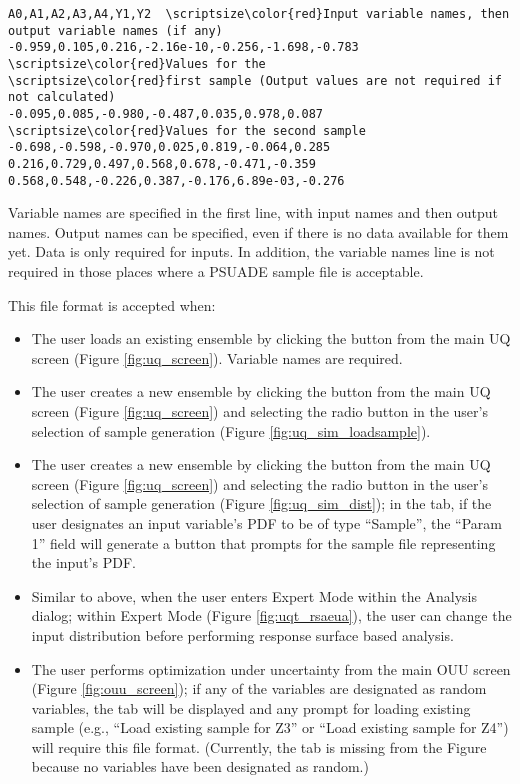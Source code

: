 \begin{Verbatim}[commandchars=\\\{\}]
A0,A1,A2,A3,A4,Y1,Y2  \scriptsize\color{red}Input variable names, then output variable names (if any)
-0.959,0.105,0.216,-2.16e-10,-0.256,-1.698,-0.783 \scriptsize\color{red}Values for the 
\scriptsize\color{red}first sample (Output values are not required if not calculated)
-0.095,0.085,-0.980,-0.487,0.035,0.978,0.087 \scriptsize\color{red}Values for the second sample
-0.698,-0.598,-0.970,0.025,0.819,-0.064,0.285 
0.216,0.729,0.497,0.568,0.678,-0.471,-0.359 
0.568,0.548,-0.226,0.387,-0.176,6.89e-03,-0.276  
\end{Verbatim}

Variable names are specified in the first line, with input names and then output names. Output names can be specified, even if there is no data available for them yet. Data is only required for inputs. In addition, the variable names line is not required in those places where a PSUADE sample file is acceptable. 

This file format is accepted when:
\begin{itemize}
	\item{The user loads an existing ensemble by clicking the  button from the main UQ screen (Figure \ref{fig:uq_screen}). Variable names are required.}
	\item{The user creates a new ensemble by clicking the  button
		from the main UQ screen (Figure \ref{fig:uq_screen}) and selecting
		the  radio button in the user's selection
		of sample generation (Figure \ref{fig:uq_sim_loadsample}).}
	\item{The user creates a new ensemble by clicking the  button
		from the main UQ screen (Figure \ref{fig:uq_screen}) and selecting
		the  radio button in the user's selection
		of sample generation (Figure \ref{fig:uq_sim_dist}); in the
		 tab, if the user designates an input variable's PDF to be of
		type ``Sample'', the ``Param 1'' field will generate a  button that prompts for the sample file representing the input's PDF.}
	\item{Similar to above, when the user enters Expert Mode within the Analysis
		dialog;
		within Expert Mode (Figure \ref{fig:uqt_rsaeua}), the user can change the input distribution before
		performing response surface based analysis.} 
	\item{The user performs optimization under uncertainty from the main OUU screen
		(Figure \ref{fig:ouu_screen});
		if any of the variables are designated as random variables, the  tab will be displayed and
		any prompt for loading existing sample (e.g., ``Load existing sample
		for Z3'' or ``Load existing sample for Z4'') will require this file
		format. (Currently, the  tab is missing from the Figure
		because no variables have been designated as random.)}
	\end{itemize}
